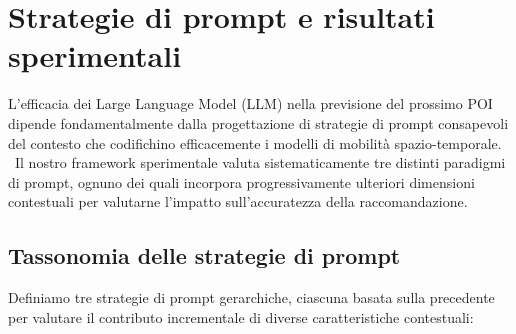 \section{Strategie di prompt e risultati sperimentali}

L'efficacia dei Large Language Model (LLM) nella previsione del prossimo POI dipende fondamentalmente dalla progettazione di strategie di prompt consapevoli del contesto che codifichino efficacemente i modelli di mobilità spazio-temporale. \ Il nostro framework sperimentale valuta sistematicamente tre distinti paradigmi di prompt, ognuno dei quali incorpora progressivamente ulteriori dimensioni contestuali per valutarne l'impatto sull'accuratezza della raccomandazione.

\subsection{Tassonomia delle strategie di prompt}

Definiamo tre strategie di prompt gerarchiche, ciascuna basata sulla precedente per valutare il contributo incrementale di diverse caratteristiche contestuali:

